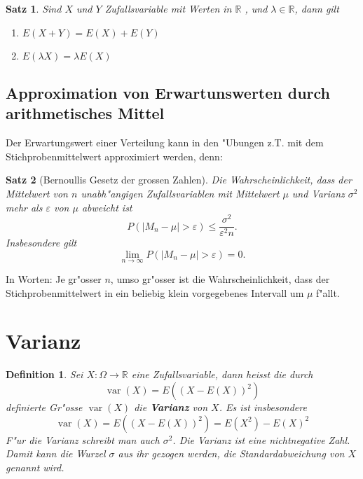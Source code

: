 \documentclass[ngerman, a4paper, 10pt, twocolumn, DIV20, headings=small]{scrartcl}
\newtheorem{definition}{Definition}
\newtheorem{satz}{Satz}
\begin{document}
\begin{satz}
\label{rechenregeln-erwartungswert}
Sind $X$ und $Y$ Zufallsvariable mit Werten in $\mathbb{R}$ ,
und $\lambda\in\mathbb{R}$, dann gilt
\begin{enumerate}
\item $E(X+Y)=E(X)+E(Y)$
\item $E(\lambda X)=\lambda E(X)$

\end{enumerate}
\end{satz}

\subsection{Approximation von Erwartunswerten durch arithmetisches Mittel}
\label{sec:approxmu}

Der Erwartungswert einer Verteilung kann in den "Ubungen z.T. mit dem Stichprobenmittelwert approximiert werden, denn:

\begin{satz}[Bernoullis Gesetz der grossen Zahlen]
Die Wahrscheinlichkeit, dass der Mittelwert von $n$ unabh"angigen Zufallsvariablen
mit Mittelwert $\mu$ und Varianz $\sigma^2$ mehr als $\varepsilon$ von $\mu$
abweicht ist
\[
P(|M_n-\mu|>\varepsilon)\le \frac{\sigma^2}{\varepsilon^2n}.
\]
Insbesondere gilt
\[
\lim_{n\to\infty}P(|M_n-\mu|>\varepsilon)=0.
\]
\end{satz}

In Worten: Je gr"osser $n$, umso gr"osser ist die Wahrscheinlichkeit, dass der Stichprobenmittelwert in ein beliebig klein vorgegebenes Intervall um $\mu$ f"allt.

\section{Varianz}
\label{sec:varianz}

\begin{definition}
Sei $X\colon\Omega\to\mathbb{R}$ eine Zufallsvariable, dann
heisst die durch 
\[
\operatorname{var}(X)=E((X-E(X))^2)
\]
 definierte Gr"osse $\operatorname{var}(X)$ die
{\bf Varianz} von $X$. Es ist insbesondere
\[
\operatorname{var}(X)=E((X-E(X))^2)=E(X^2)-E(X)^2
\]
F"ur die Varianz schreibt man auch $\sigma^2$. Die Varianz ist eine nichtnegative Zahl. Damit kann die Wurzel $\sigma$ aus ihr gezogen werden, die Standardabweichung von $X$ genannt wird.

\end{definition}
\end{document}
